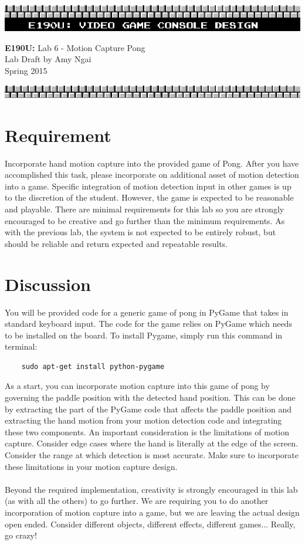\documentclass[11pt]{article}
\begin{document}
\begin{center}
\includegraphics[width=\textwidth]{title}

\textbf{E190U:} Lab 6 - Motion Capture Pong\\
Lab Draft by Amy Ngai\\
Spring 2015

\includegraphics[width=\textwidth]{bottom}
\end{center}


\section{Requirement}
Incorporate hand motion capture into the provided game of Pong. After you have accomplished this task, please incorporate on additional asset of motion detection into a game. Specific integration of motion detection input in other games is up to the discretion of the student. However, the game is expected to be reasonable and playable.  There are minimal requirements for this lab so you are strongly encouraged to be creative and go further than the minimum requirements. As with the previous lab, the system is not expected to be entirely robust, but should be reliable and return expected and repeatable results.

\section{Discussion}
You will be provided code for a generic game of pong in PyGame that takes in standard keyboard input. The code for the game relies on PyGame which needs
to be installed on the board. To install Pygame, simply run this command in terminal:
\begin{lstlisting}
	sudo apt-get install python-pygame
\end{lstlisting}
As a start, you can incorporate motion capture into this game of pong by governing the paddle position with the detected hand position. This can be done by extracting the part of the PyGame code that affects the paddle position and extracting the hand motion from your motion detection code and integrating these two components. An important consideration is the limitations of motion capture. Consider edge cases where the hand is literally at the edge of the screen. Consider the range at which detection is most accurate. Make sure to incorporate these limitations  in your motion capture design. \\ \\

Beyond the required implementation, creativity is strongly encouraged in this lab (as with all the others) to go further. We are requiring you to do another incorporation of motion capture into a game, but we are leaving the actual design open ended. Consider different objects, different effects, different games... Really, go crazy!
\end{document}
